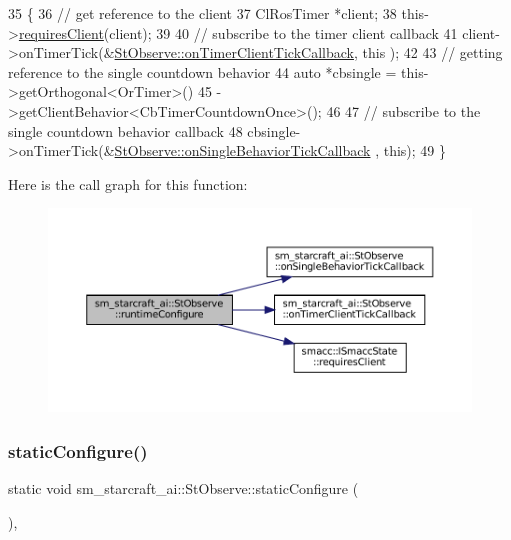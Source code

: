 \begin{DoxyCode}
35     \{
36         \textcolor{comment}{// get reference to the client}
37         ClRosTimer *client;
38         this->\hyperlink{classsmacc_1_1ISmaccState_a7f95c9f0a6ea2d6f18d1aec0519de4ac}{requiresClient}(client);
39 
40         \textcolor{comment}{// subscribe to the timer client callback}
41         client->onTimerTick(&\hyperlink{structsm__starcraft__ai_1_1StObserve_acb92d67845c27aead231cbf52b13e9c8}{StObserve::onTimerClientTickCallback}, \textcolor{keyword}{this}
      );
42 
43         \textcolor{comment}{// getting reference to the single countdown behavior}
44         \textcolor{keyword}{auto} *cbsingle = this->getOrthogonal<OrTimer>()
45                              ->getClientBehavior<CbTimerCountdownOnce>();
46 
47         \textcolor{comment}{// subscribe to the single countdown behavior callback}
48         cbsingle->onTimerTick(&\hyperlink{structsm__starcraft__ai_1_1StObserve_ad546305bf7c7f7e730bbeb5cf320930d}{StObserve::onSingleBehaviorTickCallback}
      , \textcolor{keyword}{this});
49     \}
\end{DoxyCode}
Here is the call graph for this function\+:
\nopagebreak
\begin{figure}[H]
\begin{center}
\leavevmode
\includegraphics[width=350pt]{structsm__starcraft__ai_1_1StObserve_afcc3c6aecc44b88f421a3e9990f7efb4_cgraph}
\end{center}
\end{figure}
\mbox{\label{structsm__starcraft__ai_1_1StObserve_a9aa04128ad0fb18454d9ea2db4edca48}} 
\subsubsection{\texorpdfstring{static\+Configure()}{staticConfigure()}}
{\footnotesize\ttfamily static void sm\+\_\+starcraft\+\_\+ai\+::\+St\+Observe\+::static\+Configure (\begin{DoxyParamCaption}{ }\end{DoxyParamCaption})\hspace{0.3cm}{\ttfamily [inline]}, {\ttfamily [static]}}



